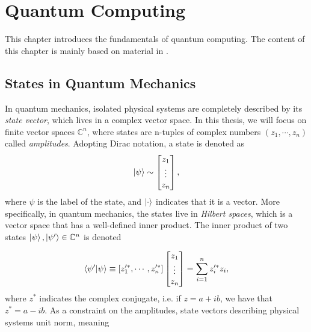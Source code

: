 \chapter{Quantum Computing}\label{chap:QuantumComputing}
This chapter introduces the fundamentals of quantum computing. The content of this chapter is mainly based on material in \citet{NielsenQuantum}.


\section{States in Quantum Mechanics}\label{sec:IntroQM}
In quantum mechanics, isolated physical systems are completely described by its \emph{state vector}, which lives in a complex vector space. In this thesis, we will focus on finite vector spaces $\mathbb{C}^n$, where states are n-tuples of complex numbers $(z_1, \cdots, z_n)$ called \emph{amplitudes}. Adopting Dirac notation, a state is denoted as 
\begin{equation}
    \ket{\psi} \sim \begin{bmatrix}
           z_{1} \\
           \vdots \\
           z_{n}
         \end{bmatrix},
\end{equation}
where $\psi$ is the label of the state, and $\ket{\cdot}$ indicates that it is a vector. More specifically, in quantum mechanics, the states live in \emph{Hilbert spaces}, which is a vector space that has a well-defined inner product. The inner product of two states $\ket{\psi}, \ket{\psi'} \in \mathbb{C}^n$ is denoted 

\begin{equation}
    \braket{\psi'}{\psi} \equiv [z_1'^*, \cdots, z_n'^*] 
    \begin{bmatrix}
        z_{1} \\
        \vdots \\
        z_{n}
    \end{bmatrix}
    = \sum_{i=1}^{n} z_i'^* z_i, 
\end{equation}
where $z^*$ indicates the complex conjugate, i.e. if $z = a + ib$, we have that $z^* = a - ib$. As a constraint on the amplitudes, state vectors describing physical systems unit norm, meaning 

